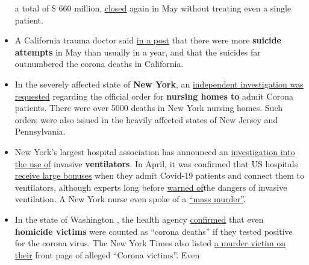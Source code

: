\begin{itemize}
  a total of \$ 660 million,
  \href{https://www.npr.org/2020/05/07/851712311/u-s-field-hospitals-stand-down-most-without-treating-any-covid-19-patients}{closed}
  again in May without treating even a single patient.
\item
  A California trauma doctor said
  \href{https://www.dailymail.co.uk/news/article-8347011/Doctors-California-say-people-killed-four-weeks-YEAR.html}{in
  a post} that there were more \textbf{suicide attempts} in May than
  usually in a year, and that the suicides far outnumbered the corona
  deaths in California.
\item
  In the severely affected state of \textbf{New York}, an
  \href{https://nypost.com/2020/05/12/calls-for-independent-probe-of-gov-cuomos-nursing-home-policies/}{independent
  investigation was requested} regarding the official order for
  \textbf{nursing homes to} admit Corona patients. There were over 5000
  deaths in New York nursing homes. Such orders were also issued in the
  heavily affected states of New Jersey and Pennsylvania.
\item
  New York's largest hospital association has announced an
  \href{https://nypost.com/2020/05/29/northwell-health-probing-use-of-ventilators-for-covid-patients/}{investigation
  into the use of} invasive \textbf{ventilators}. In April, it was
  confirmed that US hospitals
  \href{https://eu.usatoday.com/story/news/factcheck/2020/04/24/fact-check-medicare-hospitals-paid-more-covid-19-patients-coronavirus/3000638001/}{receive
  large bonuses} when they admit Covid-19 patients and connect them to
  ventilators, although experts long before
  \href{https://off-guardian.org/2020/05/06/covid19-are-ventilators-killing-people/}{warned
  of}the dangers of invasive ventilation. A New York nurse even spoke of
  a
  \href{https://nypost.com/2020/05/29/northwell-health-probing-use-of-ventilators-for-covid-patients/}{``mass
  murder''}.
\item
  In the state of Washington
  \href{https://www.freedomfoundation.com/washington/washington-health-officials-gunshot-victims-counted-as-covid-19-deaths/}{,}
  the health agency
  \href{https://www.freedomfoundation.com/washington/washington-health-officials-gunshot-victims-counted-as-covid-19-deaths/}{confirmed}
  that even \textbf{homicide victims} were counted as ``corona deaths''
  if they tested positive for the corona virus. The New York Times also
  listed
  \href{https://www.washingtontimes.com/news/2020/may/24/new-york-times-lists-homicide-victim-coronavirus-d/}{a
  murder victim on their} front page of alleged ``Corona victims''. Even

\end{itemize}
